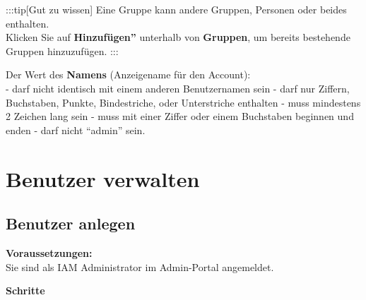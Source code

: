\documentclass[
  letterpaper,
  DIV=11,
  numbers=noendperiod]{scrreprt}
\begin{document}
:::tip{[}Gut zu wissen{]} Eine Gruppe kann andere Gruppen, Personen oder
beides enthalten.\\
Klicken Sie auf \textbf{Hinzufügen''} unterhalb von \textbf{Gruppen}, um
bereits bestehende Gruppen hinzuzufügen. :::

Der Wert des \textbf{Namens} (Anzeigename für den Account):\\
- darf nicht identisch mit einem anderen Benutzernamen sein - darf nur
Ziffern, Buchstaben, Punkte, Bindestriche, oder Unterstriche enthalten -
muss mindestens 2 Zeichen lang sein - muss mit einer Ziffer oder einem
Buchstaben beginnen und enden - darf nicht ``admin'' sein.

\chapter{Benutzer verwalten}\label{benutzer-verwalten}

\section{Benutzer anlegen}\label{benutzer-anlegen}

\textbf{Voraussetzungen:}\\
Sie sind als IAM Administrator im Admin-Portal angemeldet.

\textbf{Schritte}
\end{document}
